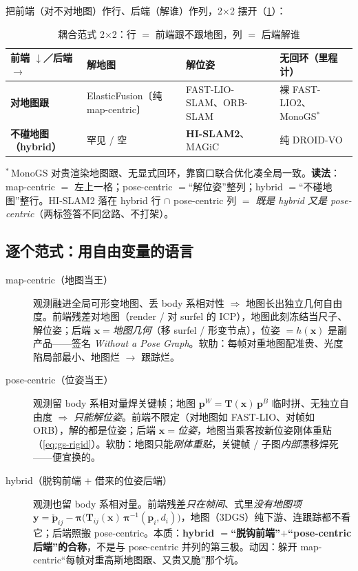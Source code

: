 把前端（对不对地图）作行、后端（解谁）作列，2$\times$2 摆开（\cref{tab:gs-paradigm}）：

\begin{table}[H]\centering
\caption{耦合范式 2$\times$2：行 $=$ 前端跟不跟地图，列 $=$ 后端解谁}
\label{tab:gs-paradigm}
\small
\begin{tabular}{@{}llll@{}}
\toprule
前端 $\downarrow$／后端 $\rightarrow$ & 解地图 & 解位姿 & 无回环（里程计）\\
\midrule
\textbf{对地图跟} & ElasticFusion〔纯 map-centric〕& FAST-LIO-SLAM、ORB-SLAM & 裸 FAST-LIO2、MonoGS$^\ast$ \\
\textbf{不碰地图（hybrid）}& 罕见 / 空 & \textbf{HI-SLAM2}、MAGiC & 纯 DROID-VO \\
\bottomrule
\end{tabular}
\end{table}
\noindent{}$^\ast$\,MonoGS 对贵渲染地图跟、无显式回环，靠窗口联合优化凑全局一致。\textbf{读法}：map-centric $=$ 左上一格；pose-centric $=$“解位姿”整列；hybrid $=$“不碰地图”整行。HI-SLAM2 落在 hybrid 行 $\cap$ pose-centric 列 $=$ \emph{既是 hybrid 又是 pose-centric}（两标签答不同岔路、不打架）。

\subsection{逐个范式：用自由变量的语言}

\begin{description}
  \item[map-centric（地图当王）] 观测融进全局可形变地图、丢 body 系相对性 $\Rightarrow$ 地图长出独立几何自由度。前端残差对地图（render / 对 surfel 的 ICP），地图此刻冻结当尺子、解位姿；后端 $\mathbf x=$\emph{地图几何}（移 surfel / 形变节点），位姿 $=h(\mathbf x)$ 是副产品——签名 \emph{Without a Pose Graph}。软肋：每帧对重地图配准贵、光度陷局部最小、地图烂 $\to$ 跟踪烂。
  \item[pose-centric（位姿当王）] 观测留 body 系相对量焊关键帧；地图 $\mathbf p^W=\mathbf T(\mathbf x)\,\mathbf p^B$ 临时拼、无独立自由度 $\Rightarrow$ \emph{只能解位姿}。前端不限定（对地图如 FAST-LIO、对帧如 ORB），解的都是位姿；后端 $\mathbf x=$\emph{位姿}，地图当乘客按新位姿刚体重贴（\cref{eq:gs-rigid}）。软肋：地图只能\emph{刚体重贴}，关键帧 / 子图\emph{内部}漂移焊死——便宜换的。
  \item[hybrid（脱钩前端 $+$ 借来的位姿后端）] 观测也留 body 系相对量。前端残差\emph{只在帧间}、式里\emph{没有地图项} $\mathbf y=\check{\mathbf p}_{ij}-\boldsymbol\pi\big(\mathbf T_{ij}(\mathbf x)\,\boldsymbol\pi^{-1}(\mathbf p_i,d_i)\big)$，地图（3DGS）纯下游、连跟踪都不看它；后端照搬 pose-centric。本质：\textbf{hybrid $=$“脱钩前端”$+$“pose-centric 后端”的合称}，不是与 pose-centric 并列的第三极。动因：躲开 map-centric“每帧对重高斯地图跟、又贵又脆”那个坑。
\end{description}

